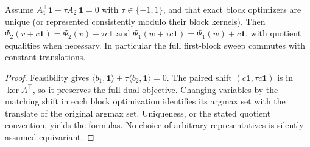 \begin{proposition}\label{app-prop:translation-equivariance}
Assume $A_1^\top\mathbf1+\tau A_2^\top\mathbf1=0$ with $\tau\in\{-1,1\}$, and that exact block optimizers are unique (or represented consistently modulo their block kernels). Then
$\Psi_2(v+c\mathbf1)=\Psi_2(v)+\tau c\mathbf1$ and
$\Psi_1(w+\tau c\mathbf1)=\Psi_1(w)+c\mathbf1$,
with quotient equalities when necessary. In particular the full first-block sweep commutes with constant translations.
\end{proposition}
\begin{proof}
Feasibility gives $\langle b_1,\mathbf1\rangle+\tau\langle b_2,\mathbf1\rangle=0$. The paired shift $(c\mathbf1,\tau c\mathbf1)$ is in $\ker A^\top$, so it preserves the full dual objective. Changing variables by the matching shift in each block optimization identifies its argmax set with the translate of the original argmax set. Uniqueness, or the stated quotient convention, yields the formulas. No choice of arbitrary representatives is silently assumed equivariant.
\end{proof}

